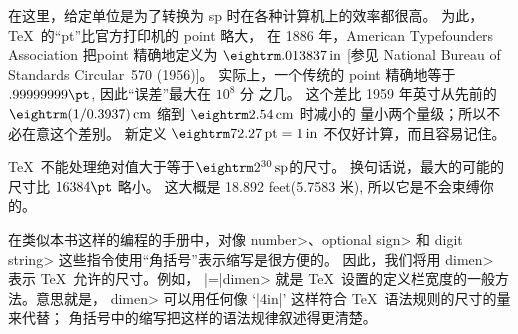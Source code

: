 \danger 在这里，给定单位是为了转换为 sp 时在各种计算机上的效率都很高。%
为此，\TeX\ 的``pt''比官方打印机的 point 略大，
在 1886 年，American
Typefounders Association 把point 精确地定义为 $\rm.013837\,in$%
[参见 National Bureau of Standards Circular~570 (1956)]。%
实际上，一个传统的 point 精确地等于 $.99999999\pt$, 因此``误差''最大在 $10^8$ 分%
之几。%
这个差比 1959 年英寸从先前的 $\rm(1/0.3937)\,cm$ 缩到 $\rm2.54\,cm$ 时减小的%
量小两个量级；所以不必在意这个差别。%
新定义 $\rm72.27\,pt=1\,in$ 不仅好计算，而且容易\hbox{记住。}

\danger \TeX\ 不能处理绝对值大于等于$\rm2^{30}\,sp$的尺寸。%
换句话说，最大的可能的尺寸比 $16384\pt$ 略小。%
这大概是 18.892 feet(5.7583 米), 所以它是不会束缚你的。

\1在类似本书这样的编程的手册中，对像 \<number>、\<optional sign> 和
\<digit string> 这些指令使用``角括号''表示缩写是很方便的。
因此，我们将用 \<dimen> 表示 \TeX\ 允许的尺寸。例如，
\begindisplay
|\hsize=|\<dimen>
\enddisplay
就是 \TeX\ 设置的定义栏宽度的一般方法。意思就是，
\<dimen> 可以用任何像 `|4in|' 这样符合 \TeX\ 语法规则的尺寸的量来代替；
角括号中的缩写把这样的语法规律叙述得更清楚。

